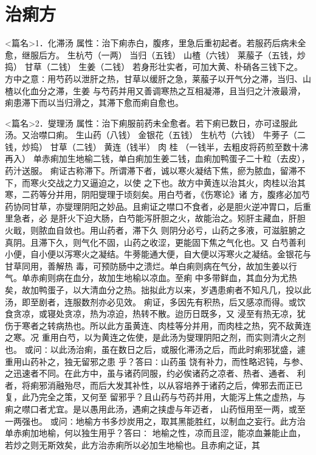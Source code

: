 \documentclass[a4paper,12pt,UTF8,twoside]{ctexbook}
\begin{document}
\chapter{治痢方}
<篇名>1．化滞汤
属性：治下痢赤白，腹疼，里急后重初起者。若服药后病未全愈，继服后方。 
生杭芍（一两） 当归（五钱） 山楂（六钱） 莱菔子（五钱，炒捣） 甘草（二钱） 生姜（二钱） 
若身形壮实者，可加大黄、朴硝各三钱下之。 
方中之意∶用芍药以泄肝之热，甘草以缓肝之急，莱菔子以开气分之滞，当归、山楂以化血分之滞，生姜 
与芍药并用又善调寒热之互相凝滞，且当归之汁液最滑，痢患滞下而以当归滑之，其滞下愈而痢自愈也。 


<篇名>2．燮理汤
属性：治下痢服前药未全愈者。若下痢已数日，亦可迳服此汤。又治噤口痢。 
生山药（八钱） 金银花（五钱） 生杭芍（六钱） 牛蒡子（二钱，炒捣） 甘草（二钱） 黄连（钱半） 肉 
桂 
（一钱半，去粗皮将药煎至数十沸再入） 
单赤痢加生地榆二钱，单白痢加生姜二钱，血痢加鸭蛋子二十粒（去皮），药汁送服。 
痢证古称滞下。所谓滞下者，诚以寒火凝结下焦，瘀为脓血，留滞不下，而寒火交战之力又逼迫之，以使 
之下也。故方中黄连以治其火，肉桂以治其寒，二药等分并用，阴阳燮理于顷刻矣。用白芍者，《伤寒论》诸 
方，腹疼必加芍药协同甘草，亦燮理阴阳之妙品。且痢证之噤口不食者，必是胆火逆冲胃口，后重里急者，必 
是肝火下迫大肠，白芍能泻肝胆之火，故能治之。矧肝主藏血，肝胆火戢，则脓血自敛也。用山药者，滞下久 
则阴分必亏，山药之多液，可滋脏腑之真阴。且滞下久，则气化不固，山药之收涩，更能固下焦之气化也。又 
白芍善利小便，自小便以泻寒火之凝结。牛蒡能通大便，自大便以泻寒火之凝结。金银花与甘草同用，善解热 
毒，可预防肠中之溃烂。单白痢则病在气分，故加生姜以行气。单赤痢则病在血分，故加生地榆以凉血。至痢 
中多带鲜血，其血分为尤热矣，故加鸭蛋子，以大清血分之热。拙拟此方以来，岁遇患痢者不知凡几，投以此 
汤，即至剧者，连服数剂亦必见效。 
痢证，多因先有积热，后又感凉而得。或饮食贪凉，或寝处贪凉，热为凉迫，热转不散。迨历日既多，又 
浸至有热无凉，犹伤于寒者之转病热也。所以此方虽黄连、肉桂等分并用，而肉桂之热，究不敌黄连之寒。况 
重用白芍，以为黄连之佐使，是此汤为燮理阴阳之剂，而实则清火之剂也。 
或问∶以此汤治痢，虽在数日之后，或服化滞汤之后，而此时痢邪犹盛，遽重用山药补之，独无留邪之患 
乎？答曰∶山药虽 
饶有补力，而性略迟钝，与参、 之迅速者不同。在此方中，虽与诸药同服，约必俟诸药之凉者、热者、通者、 
利者，将痢邪消融殆尽，而后大发其补性，以从容培养于诸药之后，俾邪去而正已复，此乃完全之策，又何至 
留邪乎？且山药与芍药并用，大能泻上焦之虚热，与痢之噤口者尤宜。是以愚用此汤，遇痢之挟虚与年迈者， 
山药恒用至一两，或至一两强也。 
或问∶地榆方书多炒炭用之，取其黑能胜红，以制血之妄行。此方治单赤痢加地榆，何以独生用乎？答曰∶ 
地榆之性，凉而且涩，能凉血兼能止血，若炒之则无斯效矣，此方治赤痢所以必加生地榆也。且赤痢之证，其 
\end{document}
